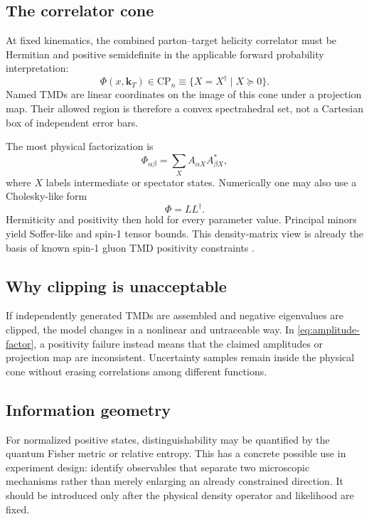 \documentclass[11pt]{article}
\newcommand{\kT}{\bm{k}_{T}}
\newcommand{\CP}{\mathrm{CP}}
\begin{document}
\subsection{The correlator cone}

At fixed kinematics, the combined parton--target helicity correlator must
be Hermitian and positive semidefinite in the applicable forward
probability interpretation:
\begin{equation}
\Phi(x,\kT)\in\CP_n
\equiv\{X=X^\dagger\mid X\succeq0\}.
\label{eq:positive-cone}
\end{equation}
Named TMDs are linear coordinates on the image of this cone under a
projection map.  Their allowed region is therefore a convex spectrahedral
set, not a Cartesian box of independent error bars.

The most physical factorization is
\begin{equation}
\Phi_{\alpha\beta}
=\sum_X A_{\alpha X}A_{\beta X}^*,
\label{eq:amplitude-factor}
\end{equation}
where \(X\) labels intermediate or spectator states.  Numerically one may
also use a Cholesky-like form
\begin{equation}
\Phi=LL^\dagger.
\label{eq:cholesky}
\end{equation}
Hermiticity and positivity then hold for every parameter value.  Principal
minors yield Soffer-like and spin-1 tensor bounds.  This density-matrix
view is already the basis of known spin-1 gluon TMD positivity constraints
\cite{Cotogno2017}.

\subsection{Why clipping is unacceptable}

If independently generated TMDs are assembled and negative eigenvalues are
clipped, the model changes in a nonlinear and untraceable way.  In
\cref{eq:amplitude-factor}, a positivity failure instead means that the
claimed amplitudes or projection map are inconsistent.  Uncertainty samples
remain inside the physical cone without erasing correlations among
different functions.

\subsection{Information geometry}

For normalized positive states, distinguishability may be quantified by
the quantum Fisher metric or relative entropy.  This has a concrete
possible use in experiment design: identify observables that separate two
microscopic mechanisms rather than merely enlarging an already constrained
direction.  It should be introduced only after the physical density
operator and likelihood are fixed.
\end{document}
